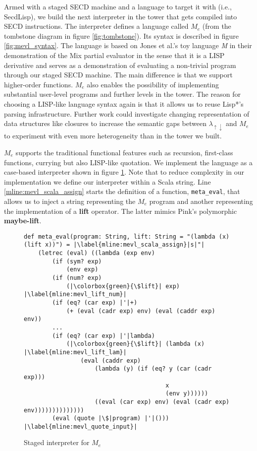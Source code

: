 \documentclass[a4paper,12pt,twoside,openright]{report}
\theoremstyle{definition}
\newcommand{\mslang}{$\lambda_{\uparrow\downarrow}$}
\newcommand{\mevl}{$M_{e}$}
\newcommand{\secdlisp}{SecdLisp}
\begin{document}
Armed with a staged SECD machine and a language to target it with (i.e., \secdlisp), we build the next interpreter in the tower that gets compiled into SECD instructions. The interpreter defines a language called \mevl{} (from the tombstone diagram in figure \ref{fig:tombstone}). Its syntax is described in figure \ref{fig:mevl_syntax}. The language is based on Jones et al.'s toy language \textit{M} in their demonstration of the Mix partial evaluator \cite{jones1989mix} in the sense that it is a LISP derivative and serves as a demonstration of evaluating a non-trivial program through our staged SECD machine. The main difference is that we support higher-order functions. \mevl{} also enables the possibility of implementing substantial user-level programs and further levels in the tower. The reason for choosing a LISP-like language syntax again is that it allows us to reuse Lisp*'s parsing infrastructure. Further work could investigate changing representation of data structures like closures to increase the semantic gaps between \mslang{} and \mevl{} to experiment with even more heterogeneity than in the tower we built.

\mevl{} supports the traditional functional features such as recursion, first-class functions, currying but also LISP-like quotation. We implement the language as a case-based interpreter shown in figure \ref{lst:mevl}. Note that to reduce complexity in our implementation we define our interpreter within a Scala string. Line \ref{mline:mevl_scala_assign} starts the definition of a function, \texttt{meta\_eval}, that allows us to inject a string representing the \mevl{} program and another representing the implementation of a \textbf{lift} operator. The latter mimics Pink's polymorphic \textbf{maybe-lift}.

\begin{figure}[htp!]
\centering
\begin{verbatim}
def meta_eval(program: String, lift: String = "(lambda (x) (lift x))") = |\label{mline:mevl_scala_assign}|s|"|
    (letrec (eval) ((lambda (exp env)
        (if (sym? exp)
            (env exp)
        (if (num? exp)
            (|\colorbox{green}{\$lift}| exp) |\label{mline:mevl_lift_num}|
        (if (eq? (car exp) |'|+)
            (+ (eval (cadr exp) env) (eval (caddr exp) env))
        ...
        (if (eq? (car exp) |'|lambda)
            (|\colorbox{green}{\$lift}| (lambda (x) |\label{mline:mevl_lift_lam}|
                (eval (caddr exp)
                    (lambda (y) (if (eq? y (car (cadr exp)))
                                        x
                                        (env y))))))
                    ((eval (car exp) env) (eval (cadr exp) env))))))))))))))
        (eval (quote |\$|program) |'|())) |\label{mline:mevl_quote_input}|
\end{verbatim}
\caption{Staged interpreter for \mevl}
\label{lst:mevl}
\end{figure}
\end{document}
